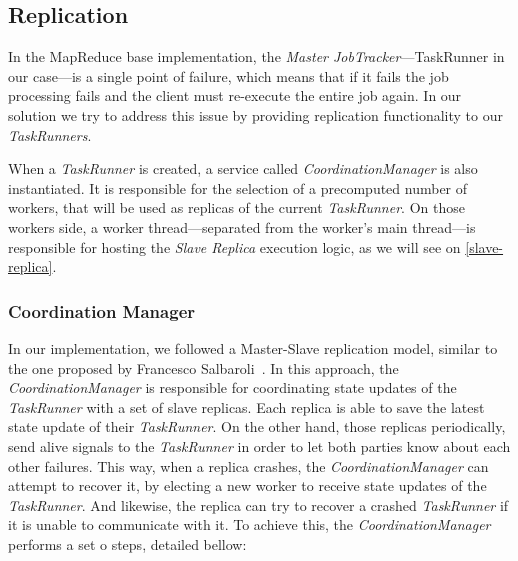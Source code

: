 \documentclass[times, 10pt,twocolumn]{article}
\begin{document}
        \subsection{Replication}
        
            In the MapReduce base implementation, the \textit{Master JobTracker}—TaskRunner in our case—is a single point of failure, which means that if it fails the job processing fails and the client must re-execute the entire job again. In our solution we try to address this issue by providing replication functionality to our \textit{TaskRunners}. 
            
            When a \textit{TaskRunner} is created, a service called \textit{CoordinationManager} is also instantiated. It is responsible for the selection of a precomputed number of workers, that will be used as replicas of the current \textit{TaskRunner}. On those workers side, a worker thread—separated from the worker's main thread—is responsible for hosting the \textit{Slave Replica} execution logic, as we will see on \ref{slave-replica}.
         
        	\subsubsection{Coordination Manager}\label{coord-man}
            
            In our implementation, we followed a Master-Slave replication model, similar to the one proposed by Francesco Salbaroli~\cite{FrancescoSalbaroli2008}. In this approach, the \textit{CoordinationManager} is responsible for coordinating state updates of the \textit{TaskRunner} with a set of slave replicas. Each replica is able to save the latest state update of their \textit{TaskRunner}. On the other hand, those replicas periodically, send alive signals to the \textit{TaskRunner} in order to let both parties know about each other failures. This way, when a replica crashes, the \textit{CoordinationManager} can attempt to recover it, by electing a new worker to receive state updates of the \textit{TaskRunner}. And likewise, the replica can try to recover a crashed \textit{TaskRunner} if it is unable to communicate with it. To achieve this, the \textit{CoordinationManager} performs a set o steps, detailed bellow:
            
\end{document}
